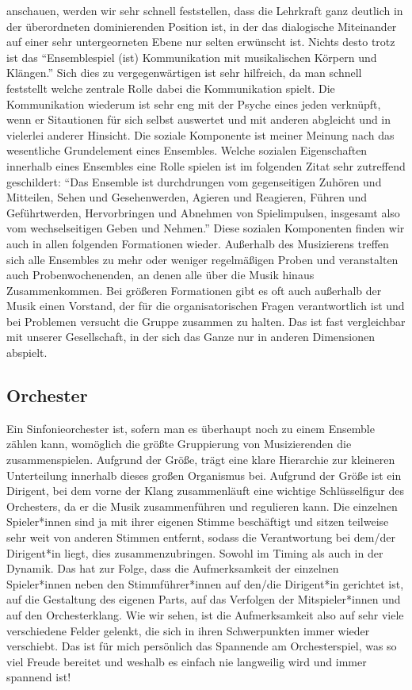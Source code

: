 anschauen, werden wir sehr schnell feststellen, dass die Lehrkraft ganz deutlich
in der überordneten dominierenden Position ist, in der das dialogische
Miteinander auf einer sehr untergeorneten Ebene nur selten erwünscht ist. Nichts
desto trotz ist das \enquote{Ensemblespiel (ist) Kommunikation mit musikalischen
Körpern und Klängen.} \autocite[62]{doerne:umfassend_musizieren} Sich dies zu
vergegenwärtigen ist sehr hilfreich, da man schnell feststellt welche zentrale
Rolle dabei die Kommunikation spielt. Die Kommunikation wiederum ist sehr eng
mit der Psyche eines jeden verknüpft, wenn er Sitautionen für sich selbst
auswertet und mit anderen abgleicht und in vielerlei anderer Hinsicht. Die
soziale Komponente ist meiner Meinung nach das wesentliche Grundelement eines
Ensembles. Welche sozialen Eigenschaften innerhalb eines Ensembles eine Rolle
spielen ist im folgenden Zitat sehr zutreffend geschildert: \enquote{Das
Ensemble ist durchdrungen vom gegenseitigen Zuhören und Mitteilen, Sehen und
Gesehenwerden, Agieren und Reagieren, Führen und Geführtwerden, Hervorbringen
und Abnehmen von Spielimpulsen, insgesamt also vom wechselseitigen Geben und
Nehmen.} \autocite[62]{doerne:umfassend_musizieren} Diese sozialen Komponenten
finden wir auch in allen folgenden Formationen wieder. Außerhalb des Musizierens
treffen sich alle Ensembles zu mehr oder weniger regelmäßigen Proben und
veranstalten auch Probenwochenenden, an denen alle über die Musik hinaus
Zusammenkommen. Bei größeren Formationen gibt es oft auch außerhalb der Musik
einen Vorstand, der für die organisatorischen Fragen verantwortlich ist und bei
Problemen versucht die Gruppe zusammen zu halten. Das ist fast vergleichbar mit
unserer Gesellschaft, in der sich das Ganze nur in anderen Dimensionen abspielt.


\subsection{Orchester} 

Ein Sinfonieorchester ist, sofern man es überhaupt noch zu einem Ensemble zählen
kann, womöglich die größte Gruppierung von Musizierenden die zusammenspielen.
Aufgrund der Größe, trägt eine klare Hierarchie zur kleineren Unterteilung
innerhalb dieses großen Organismus bei. Aufgrund der Größe ist ein Dirigent, bei
dem vorne der Klang zusammenläuft eine wichtige Schlüsselfigur des Orchesters,
da er die Musik zusammenführen und regulieren kann. Die einzelnen Spieler*innen
sind ja mit ihrer eigenen Stimme beschäftigt und sitzen teilweise sehr weit von
anderen Stimmen entfernt, sodass die Verantwortung bei dem/der Dirigent*in
liegt, dies zusammenzubringen. Sowohl im Timing als auch in der Dynamik. Das hat
zur Folge, dass die Aufmerksamkeit der einzelnen Spieler*innen neben den
Stimmführer*innen auf den/die Dirigent*in gerichtet ist, auf die Gestaltung des
eigenen Parts, auf das Verfolgen der Mitspieler*innen und auf den
Orchesterklang. \autocite[56]{doerne:umfassend_musizieren} Wie wir sehen, ist
die Aufmerksamkeit also auf sehr viele verschiedene Felder gelenkt, die sich in
ihren Schwerpunkten immer wieder verschiebt. Das ist für mich persönlich das
Spannende am Orchesterspiel, was so viel Freude bereitet und weshalb es einfach
nie langweilig wird und immer spannend ist!

